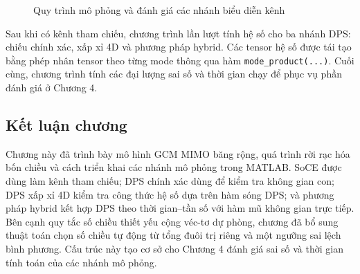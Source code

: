 \begin{figure}[H]
    \caption{Quy trình mô phỏng và đánh giá các nhánh biểu diễn kênh}
    \label{fig:ch3_simulation_flowchart}
\end{figure}

Sau khi có kênh tham chiếu, chương trình lần lượt tính hệ số cho ba nhánh DPS: chiếu chính xác, xấp xỉ 4D và phương pháp hybrid. Các tensor hệ số được tái tạo bằng phép nhân tensor theo từng mode thông qua hàm \texttt{mode\_product(...)}. Cuối cùng, chương trình tính các đại lượng sai số và thời gian chạy để phục vụ phần đánh giá ở Chương 4.

\subsection{Kết luận chương}
\label{subsec:ch3_conclusion}

Chương này đã trình bày mô hình GCM MIMO băng rộng, quá trình rời rạc hóa bốn chiều và cách triển khai các nhánh mô phỏng trong MATLAB. SoCE được dùng làm kênh tham chiếu; DPS chính xác dùng để kiểm tra không gian con; DPS xấp xỉ 4D kiểm tra công thức hệ số dựa trên hàm sóng DPS; và phương pháp hybrid kết hợp DPS theo thời gian--tần số với hàm mũ không gian trực tiếp. Bên cạnh quy tắc số chiều thiết yếu cộng véc-tơ dự phòng, chương đã bổ sung thuật toán chọn số chiều tự động từ tổng đuôi trị riêng và một ngưỡng sai lệch bình phương. Cấu trúc này tạo cơ sở cho Chương 4 đánh giá sai số và thời gian tính toán của các nhánh mô phỏng.

\cleardoublepage
